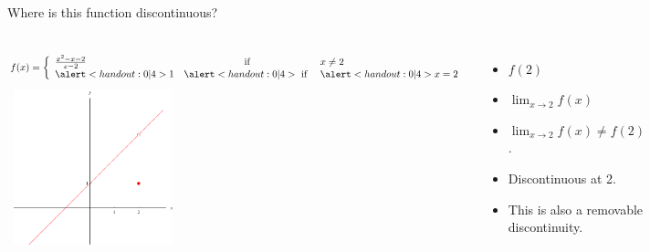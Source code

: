 \begin{frame}
\begin{example}[Example 2c, p. 114]
Where is this function discontinuous?
\begin{columns}[c]
\[
f(x) = \left\{ \begin{array}{lcl}
\frac{x^2 - x - 2}{x-2} & \text{ if } & x \neq 2 \\
\alert<handout:0 |4>{1} & \alert<handout:0 |4>{\text{ if }} & \alert<handout:0 |4>{x = 2} \\
\end{array}\right.
\]
\ \includegraphics[height=4.5cm]{continuity/pictures/02-05-ex2c.pdf}%
\begin{itemize}
\item<2-| alert@3-4>  $f(2)$ 
\item<2-| alert@5-6>  $\lim_{x\rightarrow 2} f(x)$ 
\item<7->  $\lim_{x\rightarrow 2}f(x) \neq f(2)$.
\item<8->  Discontinuous at 2.
\item<9->  This is also a removable discontinuity.
\end{itemize}
\end{columns}
\end{example}
\end{frame}



